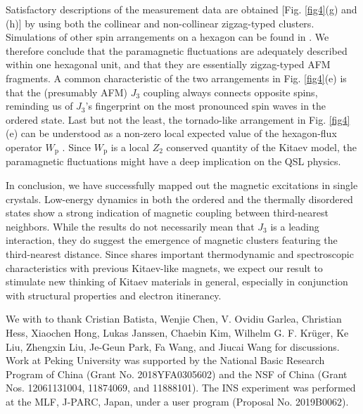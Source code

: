 \documentclass[%
reprint,
superscriptaddress,
amsmath,amssymb,
aps,
prb,
]{revtex4-2}
\begin{document}
Satisfactory descriptions of the measurement data are obtained [Fig. \ref{fig4}(g) and (h)] by using both the collinear and non-collinear zigzag-typed clusters. Simulations of other spin arrangements on a hexagon can be found in \cite{SM}. We therefore conclude that the paramagnetic fluctuations are adequately described within one hexagonal unit, and that they are essentially zigzag-typed AFM fragments. A common characteristic of the two arrangements in Fig. \ref{fig4}(e) is that the (presumably AFM) $J_3$ coupling always connects opposite spins, reminding us of $J_3$'s fingerprint on the most pronounced spin waves in the ordered state. Last but not the least, the tornado-like arrangement in Fig. \ref{fig4}(e) can be understood as a non-zero local expected value of the hexagon-flux operator $W_\mathrm{p}$ \cite{Kitaev2006,Takagi2019}. Since $W_\mathrm{p}$ is a local $Z_2$ conserved quantity of the Kitaev model, the paramagnetic fluctuations might have a deep implication on the QSL physics.
	
In conclusion, we have successfully mapped out the magnetic excitations in  single crystals. Low-energy dynamics in both the ordered and the thermally disordered states show a strong indication of magnetic coupling between third-nearest neighbors. While the results do not necessarily mean that $J_3$ is a leading interaction, they do suggest the emergence of magnetic clusters featuring the third-nearest distance. Since  shares important thermodynamic and spectroscopic characteristics with previous Kitaev-like magnets, we expect our result to stimulate new thinking of Kitaev materials in general, especially in conjunction with structural properties and electron itinerancy.
	
We with to thank Cristian Batista, Wenjie Chen, V. Ovidiu Garlea, Christian Hess, Xiaochen Hong, Lukas Janssen, Chaebin Kim, Wilhelm G. F. Kr\"{u}ger, Ke Liu, Zhengxin Liu, Je-Geun Park, Fa Wang, and Jiucai Wang for discussions. Work at Peking University was supported by the National Basic Research Program of China (Grant No. 2018YFA0305602) and the NSF of China (Grant Nos. 12061131004, 11874069, and 11888101). The INS experiment was performed at the MLF, J-PARC, Japan, under a user program (Proposal No. 2019B0062).

\nocite{apsrev42Control}

	


\pagebreak
\pagebreak
\end{document}
